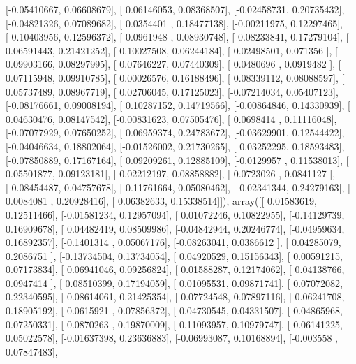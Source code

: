 \documentclass{article}
\begin{document}
       [-0.05410667,  0.06608679],
       [ 0.06146053,  0.08368507],
       [-0.02458731,  0.20735432],
       [-0.04821326,  0.07089682],
       [ 0.0354401 ,  0.18477138],
       [-0.00211975,  0.12297465],
       [-0.10403956,  0.12596372],
       [-0.0961948 ,  0.08930748],
       [ 0.08233841,  0.17279104],
       [ 0.06591443,  0.21421252],
       [-0.10027508,  0.06244184],
       [ 0.02498501,  0.071356  ],
       [ 0.09903166,  0.08297995],
       [ 0.07646227,  0.07440309],
       [ 0.0480696 ,  0.0919482 ],
       [ 0.07115948,  0.09910785],
       [ 0.00026576,  0.16188496],
       [ 0.08339112,  0.08088597],
       [ 0.05737489,  0.08967719],
       [ 0.02706045,  0.17125023],
       [-0.07214034,  0.05407123],
       [-0.08176661,  0.09008194],
       [ 0.10287152,  0.14719566],
       [-0.00864846,  0.14330939],
       [ 0.04630476,  0.08147542],
       [-0.00831623,  0.07505476],
       [ 0.0698414 ,  0.11116048],
       [-0.07077929,  0.07650252],
       [ 0.06959374,  0.24783672],
       [-0.03629901,  0.12544422],
       [-0.04046634,  0.18802064],
       [-0.01526002,  0.21730265],
       [ 0.03252295,  0.18593483],
       [-0.07850889,  0.17167164],
       [ 0.09209261,  0.12885109],
       [-0.0129957 ,  0.11538013],
       [ 0.05501877,  0.09123181],
       [-0.02212197,  0.08858882],
       [-0.0723026 ,  0.0841127 ],
       [-0.08454487,  0.04757678],
       [-0.11761664,  0.05080462],
       [-0.02341344,  0.24279163],
       [ 0.0084081 ,  0.20928416],
       [ 0.06382633,  0.15338514]]), array([[ 0.01583619,  0.12511466],
       [-0.01581234,  0.12957094],
       [ 0.01072246,  0.10822955],
       [-0.14129739,  0.16909678],
       [ 0.04482419,  0.08509986],
       [-0.04842944,  0.20246774],
       [-0.04959634,  0.16892357],
       [-0.1401314 ,  0.05067176],
       [-0.08263041,  0.0386612 ],
       [ 0.04285079,  0.2086751 ],
       [-0.13734504,  0.13734054],
       [ 0.04920529,  0.15156343],
       [ 0.00591215,  0.07173834],
       [ 0.06941046,  0.09256824],
       [ 0.01588287,  0.12174062],
       [ 0.04138766,  0.0947414 ],
       [ 0.08510399,  0.17194059],
       [ 0.01095531,  0.09871741],
       [ 0.07072082,  0.22340595],
       [ 0.08614061,  0.21425354],
       [ 0.07724548,  0.07897116],
       [-0.06241708,  0.18905192],
       [-0.0615921 ,  0.07856372],
       [ 0.04730545,  0.04331507],
       [-0.04865968,  0.07250331],
       [-0.0870263 ,  0.19870009],
       [ 0.11093957,  0.10979747],
       [-0.06141225,  0.05022578],
       [-0.01637398,  0.23636883],
       [-0.06993087,  0.10168894],
       [-0.003558  ,  0.07847483],
\end{document}
